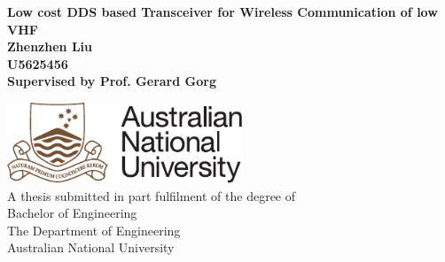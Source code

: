 \documentclass[a4paper,12pt]{report}
\title{\THETITLE}
\author{\THEAUTHOR}
\date{\today}
\def\THETITLE{Low cost DDS based Transceiver for Wireless Communication of low VHF}
\def\THEAUTHOR{Zhenzhen Liu}
\def\studentID{U5625456}
\def\supervisor{Prof. Gerard Gorg}
\begin{document}
  \setcounter{secnumdepth}{5}
  \setcounter{tocdepth}{7}
  \linespread{1.2}
  \selectfont
  
  \begin{titlepage}
    \vspace*{\fill}
    \begin{center}

      \makeatletter
      \Huge\textbf{\THETITLE} \\[1.5cm]
      \huge\textbf{\THEAUTHOR\ \\ \studentID} \\[1.5cm]
      \Large\textbf{Supervised by \supervisor} \\[1.5cm]
      \thismonth
      \makeatother
      
      \vspace*{\fill}
      \includegraphics[width=70mm]{images/logo} \\[2cm]
      \vspace*{-1.5cm}
      \Large A thesis submitted in part fulfilment of the degree of \\[0.5cm]
      \LARGE Bachelor of Engineering\\
      The Department of Engineering\\
      Australian National University \\ [0.8cm]      
    \end{center}
    \vspace*{\fill}
  \end{titlepage}

  
  

  
\end{document}
